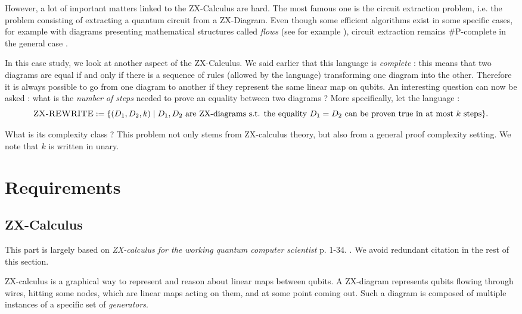 \documentclass[journal,onecolumn]{IEEEtran}
\begin{document}
However, a lot of important matters linked to the ZX-Calculus are hard. The most famous one is the circuit extraction problem, i.e. the problem consisting of extracting a quantum circuit from a ZX-Diagram. Even though some efficient algorithms exist in some specific cases, for example with diagrams presenting mathematical structures called \textit{flows} (see for example \cite{ZXflowEfficient}), circuit extraction remains \#P-complete in the general case \cite{ZXSharpHard}.

In this case study, we look at another aspect of the ZX-Calculus. We said earlier that this language is \textit{complete} : this means that two diagrams are equal if and only if there is a sequence of rules (allowed by the language) transforming one diagram into the other. Therefore it is always possible to go from one diagram to another if they represent the same linear map on qubits. An interesting question can now be asked : what is the \textit{number of steps} needed to prove an equality between two diagrams ? More specifically, let the language :
$$
\textsc{ZX-REWRITE} := \{ (D_1, D_2, k) \; | \; D_1, D_2 \text{ are ZX-diagrams s.t. the equality } D_1=D_2 \text{ can be proven true in at most } k \text{ steps}\}.
$$ 

What is its complexity class ? This problem not only stems from ZX-calculus theory, but also from a general proof complexity setting. We note that $k$ is written in unary. 

\section{Requirements}

\subsection{ZX-Calculus}

This part is largely based on \textit{ZX-calculus for the working quantum computer scientist} p. 1-34. \cite{ZXCourse}. We avoid redundant citation in the rest of this section.

ZX-calculus is a graphical way to represent and reason about linear maps between qubits. A ZX-diagram represents qubits flowing through wires, hitting some nodes, which are linear maps acting on them, and at some point coming out. Such a diagram is composed of multiple instances of a specific set of \textit{generators}.
\end{document}
